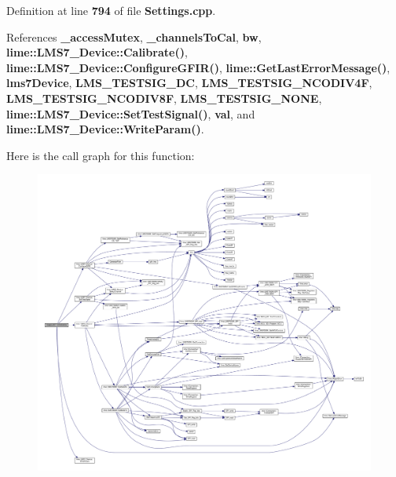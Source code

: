 Definition at line {\bf 794} of file {\bf Settings.\+cpp}.



References {\bf \+\_\+access\+Mutex}, {\bf \+\_\+channels\+To\+Cal}, {\bf bw}, {\bf lime\+::\+L\+M\+S7\+\_\+\+Device\+::\+Calibrate()}, {\bf lime\+::\+L\+M\+S7\+\_\+\+Device\+::\+Configure\+G\+F\+I\+R()}, {\bf lime\+::\+Get\+Last\+Error\+Message()}, {\bf lms7\+Device}, {\bf L\+M\+S\+\_\+\+T\+E\+S\+T\+S\+I\+G\+\_\+\+DC}, {\bf L\+M\+S\+\_\+\+T\+E\+S\+T\+S\+I\+G\+\_\+\+N\+C\+O\+D\+I\+V4F}, {\bf L\+M\+S\+\_\+\+T\+E\+S\+T\+S\+I\+G\+\_\+\+N\+C\+O\+D\+I\+V8F}, {\bf L\+M\+S\+\_\+\+T\+E\+S\+T\+S\+I\+G\+\_\+\+N\+O\+NE}, {\bf lime\+::\+L\+M\+S7\+\_\+\+Device\+::\+Set\+Test\+Signal()}, {\bf val}, and {\bf lime\+::\+L\+M\+S7\+\_\+\+Device\+::\+Write\+Param()}.



Here is the call graph for this function\+:
\nopagebreak
\begin{figure}[H]
\begin{center}
\leavevmode
\includegraphics[width=350pt]{d9/d90/classSoapyLMS7_a3ed334e7d2f7c168515f4b9ee6f46545_cgraph}
\end{center}
\end{figure}


